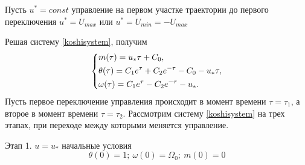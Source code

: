\documentclass[a4paper,14pt]{article}
\theoremstyle{plain} %
\theoremstyle{definition} %
\theoremstyle{remark} %
\begin{document}
{Пусть $u^*=const$ управление на первом участке траектории до первого переключения $u^*=U_{max}$ или $u^*=U_{min}=-U_{max}$

Решая систему \eqref{koshisystem}, получим
\begin{equation}\label{solvekoshi}
    \left\{ {\begin{aligned}
                 & m(\tau) = u_*\tau+C_0, \hfill                              \\
                 & \theta(\tau) = C_1e^\tau+C_2e^{-\tau}-C_0-u_*\tau , \hfill \\
                 & \omega(\tau) = C_1e^\tau-C_2e^{-\tau}-u_*  . \hfill        \\
            \end{aligned}} \right.
\end{equation}
Пусть первое переключение управления происходит в момент времени
$\tau=\tau_1$, а второе в момент времени
$\tau=\tau_2$. Рассмотрим систему \eqref{koshisystem} на трех этапах,
при переходе между которыми меняется управление.

Этап 1. $u=u_*$ начальные условия
\[
    \theta(0)=1;\ \omega(0)=\Omega_0;\ m(0)=0
\]

}
\end{document}
